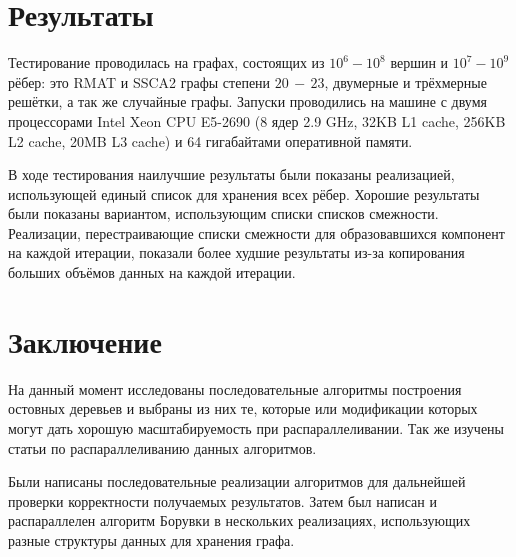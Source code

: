 \documentclass{article}
\begin{document}



\section{Результаты}
Тестирование проводилась на графах, состоящих из $10^6-10^8$ вершин и $10^7-10^9$ рёбер: это RMAT и SSCA2 графы степени $20\,-\,23$, двумерные и трёхмерные решётки, а так же случайные графы.
Запуски проводились на машине с двумя процессорами Intel Xeon CPU E5-2690 (8 ядер 2.9 GHz, 32KB L1 cache, 256KB L2 cache, 20MB L3 cache) и 64 гигабайтами оперативной памяти.

В ходе тестирования наилучшие результаты были показаны реализацией, использующей единый список для хранения всех рёбер. Хорошие результаты были показаны вариантом, использующим списки списков смежности.
Реализации, перестраивающие списки смежности для образовавшихся компонент на каждой итерации, показали более худшие результаты из-за копирования больших объёмов данных на каждой итерации. 



\section{Заключение}
На данный момент исследованы последовательные алгоритмы построения остовных деревьев и выбраны из них те, которые или модификации которых могут дать хорошую масштабируемость при распараллеливании. Так же изучены статьи  \cite{dense-mst,boruvka-prima,boruvka-cm5} по распараллеливанию данных алгоритмов.

Были написаны последовательные реализации алгоритмов для дальнейшей проверки корректности получаемых результатов. Затем был написан и распараллелен алгоритм Борувки в нескольких реализациях, использующих разные структуры данных для хранения графа.
\end{document}
